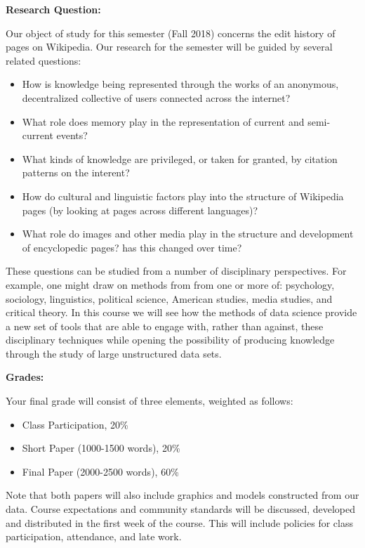 \documentclass[12pt]{article}
\begin{document}
\textbf{Research Question:} \vspace{6pt}

Our object of study for this semester (Fall 2018) concerns the edit history
of pages on Wikipedia. Our research for the semester will be guided by several
related questions:

\begin{itemize}\setlength\itemsep{0em}
\item How is knowledge being represented through the works of an anonymous,
decentralized collective of users connected across the internet?
\item What role does memory play in the representation of current and
semi-current events?
\item What kinds of knowledge are privileged, or taken for granted, by
citation patterns on the interent?
\item How do cultural and linguistic factors play into the structure of
Wikipedia pages (by looking at pages across different languages)?
\item What role do images and other media play in the structure and
development of encyclopedic pages? has this changed over time?
\end{itemize}

These questions can be studied from a number of disciplinary perspectives.
For example, one might draw on methods from from one or more of: psychology,
sociology, linguistics, political science, American studies, media studies,
and critical theory. In this course we will see how the methods of data
science provide a new set of tools that are able to engage with, rather than
against, these disciplinary techniques while opening the possibility of
producing knowledge through the study of large unstructured data sets.

\clearpage

\textbf{Grades:} \vspace{6pt}

Your final grade will consist of three elements, weighted as follows:

\begin{itemize}[noitemsep,topsep=0pt]
\item Class Participation, 20\%
\item Short Paper (1000-1500 words), 20\%
\item Final Paper (2000-2500 words), 60\%
\end{itemize}

Note that both papers will also include graphics and models constructed from
our data. Course expectations and community standards will be discussed,
developed and distributed in the first week of the course. This will include
policies for class participation, attendance, and late work.
\end{document}
